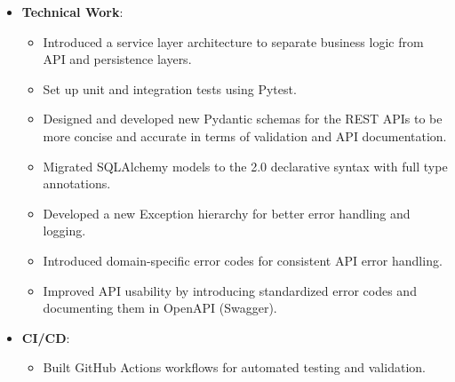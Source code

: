 \documentclass[10pt, dvipsnames, svgnames, x11names]{article}
\begin{document}
\begin{itemize}[nosep]
\begin{itemize}[nosep]
\item 
Built a real-time chat service enabling communication between trainers and trainees.
\end{itemize}

\item \textbf{Technical Work}:
\begin{itemize}[nosep]
\item 
Introduced a service layer architecture to separate business logic from API and persistence layers.

\item 
Set up unit and integration tests using Pytest.

\item 
Designed and developed new Pydantic schemas for the REST APIs to be more concise and accurate in terms of validation and API documentation.

\item 
Migrated SQLAlchemy models to the 2.0 declarative syntax with full type annotations.

\item 
Developed a new Exception hierarchy for better error handling and logging.

\item 
Introduced domain-specific error codes for consistent API error handling.

\item Improved API usability by introducing standardized error codes and documenting them in OpenAPI (Swagger).
\end{itemize}

\item \textbf{CI/CD}:
\begin{itemize}[nosep]
\item Built GitHub Actions workflows for automated testing and validation.
\end{itemize}
\end{itemize}
\end{document}
